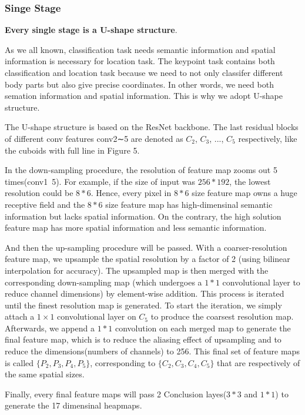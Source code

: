 \subsubsection{Singe Stage}

\textbf{Every single stage is a U-shape structure}.

As we all known, classification task needs semantic information and spatial information is necessary for location task.
The keypoint task contains both classification and location task because we need to not only classifer different body parts but also give precise coordinates.
In other words, we need both semation information and spatial information.
This is why we adopt U-shape structure.

The U-shape structure is based on the ResNet backbone. The last residual blocks of different conv features conv2∼5 are denoted as $C_{2}$, $C_{3}$, ..., $C_{5}$ respectively, like the cuboids with full line in Figure 5.

In the down-sampling procedure, the resolution of feature map zooms out 5 times(conv1~5).
For example, if the size of input was $256*192$, the lowest resolution could be $8*6$.
Hence, every pixel in $8*6$ size feature map owns a huge receptive field and the $8*6$ size feature map has high-dimensinal semantic information but lacks spatial information.
On the contrary, the high solution feature map has more spatial information and less semantic information.

And then the up-sampling procedure will be passed.
With a coarser-resolution feature map, we upsample the spatial resolution by a factor of 2 (using bilinear interpolation for accuracy).
The upsampled map is then merged with the corresponding down-sampling map (which undergoes a $1*1$ convolutional layer to reduce channel dimensions) by element-wise addition.
This process is iterated until the finest resolution map is generated.
To start the iteration, we simply attach a $1×1$ convolutional layer on $C_{5}$ to produce the coarsest resolution map.
Afterwards, we append a $1*1$ convolution on each merged map to generate the final feature map, which is to reduce the aliasing effect of upsampling and to reduce the dimensions(numbers of channels) to 256.
This final set of feature maps is called $\{P_{2}, P_{3}, P_{4}, P_{5}\}$, corresponding to $\{C_{2}, C_{3}, C_{4}, C_{5}\}$
that are respectively of the same spatial sizes.

Finally, every final feature maps will pass 2 Conclusion layes($3*3$ and $1*1$) to generate the 17 dimensinal heapmaps.

